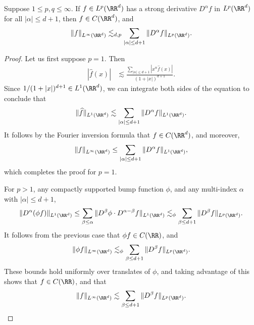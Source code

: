 \begin{lemma}
  Suppose $1 \leq p,q \leq \infty$. If $f \in L^p(\RR^d)$ has a strong derivative $D^\alpha f$ in $L^p(\RR^d)$ for all $|\alpha| \leq d+1$, then $f \in C(\RR^d)$, and
    \[ \| f \|_{L^\infty(\RR^d)} \lesssim_{d,p} \sum_{|\alpha| \leq d + 1} \| D^\alpha f \|_{L^p(\RR^d)}. \]
\end{lemma}
\begin{proof}
    Let us first suppose $p = 1$. Then
    \begin{align*}
      |\widehat{f}(x)| &\lesssim \frac{\sum_{|\alpha| \leq d+1} |x^\alpha \widehat{f}(x)|}{(1 + |x|)^{d+1}}.
    \end{align*}
    Since $1/(1 + |x|)^{d+1} \in L^1(\RR^d)$, we can integrate both sides of the equation to conclude that
    \[ \| \widehat{f} \|_{L^1(\RR^d)} \lesssim \sum_{|\alpha| \leq d+1} \| D^\alpha f \|_{L^1(\RR^d)}. \]
    It follows by the Fourier inversion formula that $f \in C(\RR^d)$, and moreover,
    \[ \| f \|_{L^\infty(\RR^d)} \leq \sum_{|\alpha| \leq d+1} \| D^\alpha f \|_{L^1(\RR^d)}, \]
    which completes the proof for $p = 1$.

    For $p > 1$, any compactly supported bump function $\phi$, and any multi-index $\alpha$ with $|\alpha| \leq d+1$,
    \[ \| D^\alpha(\phi f) \|_{L^1(\RR^d)} \leq \sum_{\beta \leq \alpha} \| D^\beta \phi \cdot D^{\alpha - \beta} f \|_{L^1(\RR^d)} \lesssim_\phi \sum_{\beta \leq d+1} \| D^\beta f \|_{L^p(\RR^d)}. \]
    It follows from the previous case that $\phi f \in C(\RR)$, and
    \[ \| \phi f \|_{L^\infty(\RR^d)} \lesssim_\phi \sum_{\beta \leq d+1} \| D^\beta f \|_{L^p(\RR^d)}. \]
    These bounds hold uniformly over translates of $\phi$, and taking advantage of this shows that $f \in C(\RR)$, and that
    \[ \| f \|_{L^\infty(\RR^d)} \lesssim \sum_{\beta \leq d+1} \| D^\beta f \|_{L^p(\RR^d)}. \qedhere \]
\end{proof}

